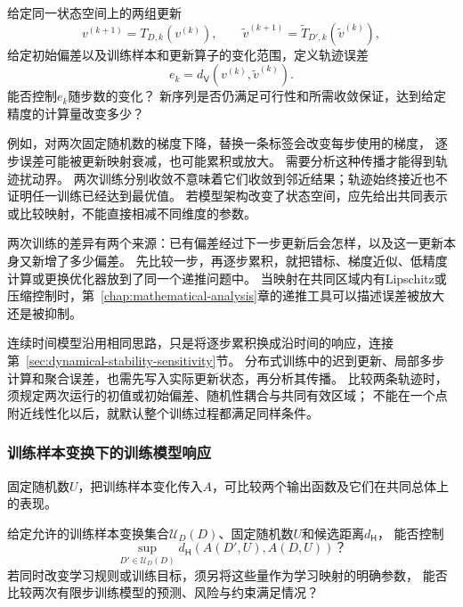 \begin{mathproblem}[训练轨迹对训练样本和学习规则的响应]
  \label{question:future-iteration-perturbation}
  给定同一状态空间上的两组更新
  \[
    v^{(k+1)}=T_{D,k}(v^{(k)}),\qquad
    \widetilde v^{(k+1)}=\widetilde T_{D',k}(\widetilde v^{(k)}),
  \]
  给定初始偏差以及训练样本和更新算子的变化范围，定义轨迹误差
  \[
    e_k=d_{\mathsf V}(v^{(k)},\widetilde v^{(k)}).
  \]
  能否控制$e_k$随步数的变化？
  新序列是否仍满足可行性和所需收敛保证，达到给定精度的计算量改变多少？
\end{mathproblem}

例如，对两次固定随机数的梯度下降，替换一条标签会改变每步使用的梯度，
逐步误差可能被更新映射衰减，也可能累积或放大。
需要分析这种传播才能得到轨迹扰动界。
两次训练分别收敛不意味着它们收敛到邻近结果；轨迹始终接近也不证明任一训练已经达到最优值。
若模型架构改变了状态空间，应先给出共同表示或比较映射，不能直接相减不同维度的参数。

两次训练的差异有两个来源：已有偏差经过下一步更新后会怎样，以及这一更新本身又新增了多少偏差。
先比较一步，再逐步累积，就把错标、梯度近似、低精度计算或更换优化器放到了同一个递推问题中。
当映射在共同区域内有Lipschitz或压缩控制时，第~\ref{chap:mathematical-analysis}章的递推工具可以描述误差被放大还是被抑制。

连续时间模型沿用相同思路，只是将逐步累积换成沿时间的响应，连接第~\ref{sec:dynamical-stability-sensitivity}节。
分布式训练中的迟到更新、局部多步计算和聚合误差，也需先写入实际更新状态，再分析其传播。
比较两条轨迹时，须规定两次运行的初值或初始偏差、随机性耦合与共同有效区域；
不能在一个点附近线性化以后，就默认整个训练过程都满足同样条件。

\subsubsection{训练样本变换下的训练模型响应}
\label{sec:future-analysis-perturbation-map}

固定随机数$U$，把训练样本变化传入$A$，可比较两个输出函数及它们在共同总体上的表现。

\begin{mathproblem}[训练样本变换造成的训练模型差异]
  \label{question:future-perturbation-map}
  给定允许的训练样本变换集合$\mathcal U_D(D)$、固定随机数$U$和候选距离$d_{\mathsf H}$，
  能否控制
  \[
    \sup_{D'\in\mathcal U_D(D)}
      d_{\mathsf H}(A(D',U),A(D,U))\text{？}
  \]
  若同时改变学习规则或训练目标，须另将这些量作为学习映射的明确参数，
  能否比较两次有限步训练模型的预测、风险与约束满足情况？
\end{mathproblem}

